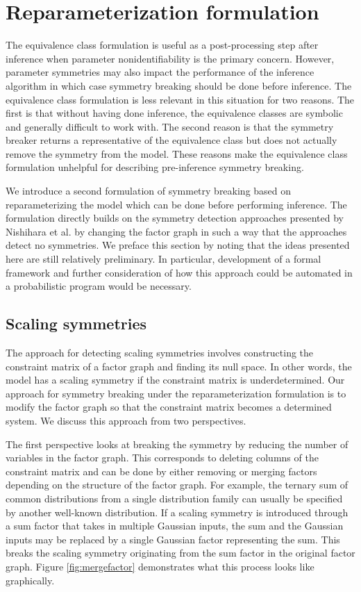 

\section{Reparameterization formulation}

The equivalence class formulation is useful as a post-processing step after inference when parameter nonidentifiability is the primary concern. However, parameter symmetries may also impact the performance of the inference algorithm in which case symmetry breaking should be done before inference. The equivalence class formulation is less relevant in this situation for two reasons. The first is that without having done inference, the equivalence classes are symbolic and generally difficult to work with. The second reason is that the symmetry breaker returns a representative of the equivalence class but does not actually remove the symmetry from the model. These reasons make the equivalence class formulation unhelpful for describing pre-inference symmetry breaking.

We introduce a second formulation of symmetry breaking based on reparameterizing the model which can be done before performing inference. The formulation directly builds on the symmetry detection approaches presented by Nishihara et al. by changing the factor graph in such a way that the approaches detect no symmetries. We preface this section by noting that the ideas presented here are still relatively preliminary. In particular, development of a formal framework and further consideration of how this approach could be automated in a probabilistic program would be necessary.


\subsection{Scaling symmetries}

The approach for detecting scaling symmetries involves constructing the constraint matrix of a factor graph and finding its null space. In other words, the model has a scaling symmetry if the constraint matrix is underdetermined. Our approach for symmetry breaking under the reparameterization formulation is to modify the factor graph so that the constraint matrix becomes a determined system. We discuss this approach from two perspectives. 

The first perspective looks at breaking the symmetry by reducing the number of variables in the factor graph. This corresponds to deleting columns of the constraint matrix and can be done by either removing or merging factors depending on the structure of the factor graph. For example, the ternary sum of common distributions from a single distribution family can usually be specified by another well-known distribution. If a scaling symmetry is introduced through a sum factor that takes in multiple Gaussian inputs, the sum and the Gaussian inputs may be replaced by a single Gaussian factor representing the sum. This breaks the scaling symmetry originating from the sum factor in the original factor graph. Figure \ref{fig:mergefactor} demonstrates what this process looks like graphically.

